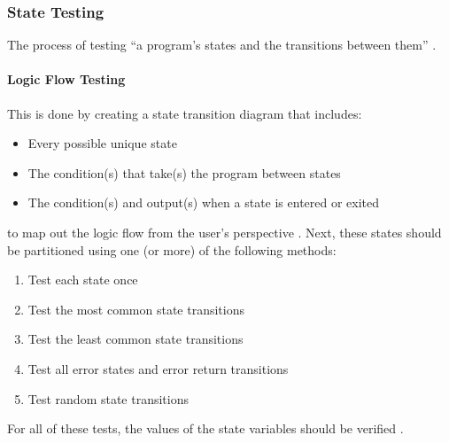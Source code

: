 \subsubsection{State Testing \cite[p.~79-87]{patton_software_2006}}

The process of testing ``a program's states and the transitions between them''
\cite[p.~79]{patton_software_2006}.

\paragraph{Logic Flow Testing \cite[p.~80-84]{patton_software_2006}}

This is done by creating a state transition diagram that includes:

\begin{itemize}
      \item Every possible unique state
      \item The condition(s) that take(s) the program between states
      \item The condition(s) and output(s) when a state is entered or exited
\end{itemize}

to map out the logic flow from the user's perspective
\cite[p.~81-82]{patton_software_2006}. Next, these states should be
partitioned using one (or more) of the following methods:

\begin{enumerate}
      \item Test each state once
      \item Test the most common state transitions
      \item Test the least common state transitions
      \item Test all error states and error return transitions
      \item Test random state transitions
            \cite[p.~82-83]{patton_software_2006}
\end{enumerate}

For all of these tests, the values of the state variables should be verified
\cite[p.~83]{patton_software_2006}.

